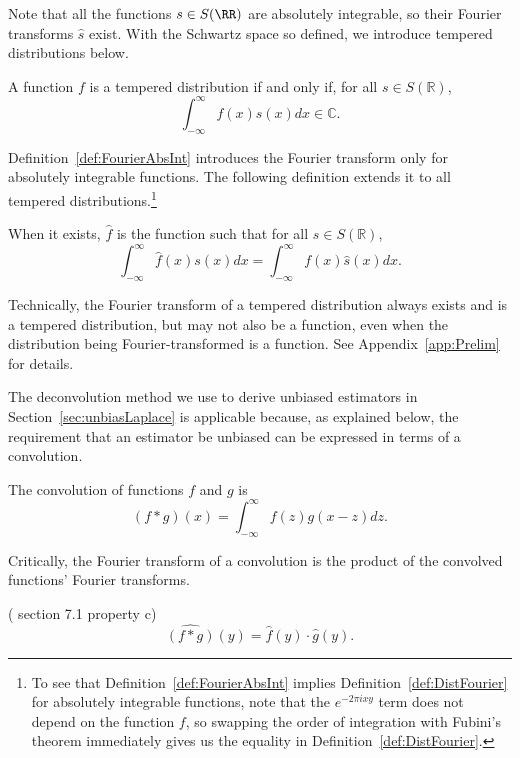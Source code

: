 \documentclass[11pt]{article}
\newcommand{\C}{\mathbb{C}}
\newcommand{\R}{\mathbb{R}}
\begin{document}
Note that all the functions $s \in S(\RR)$ are absolutely integrable, so their Fourier transforms $\hat s$ exist. With the Schwartz space so defined, we introduce tempered distributions below.

\begin{definition} \label{def:tmprDist}
    A function $f$ is a tempered distribution if and only if, for all $s \in S(\R)$,
    $$\int_{-\infty}^\infty f(x) s(x)dx \in \C.$$
\end{definition}

Definition~\ref{def:FourierAbsInt} introduces the Fourier transform only for absolutely integrable functions. The following definition extends it to all tempered distributions.\footnote{To see that Definition~\ref{def:FourierAbsInt} implies Definition~\ref{def:DistFourier} for absolutely integrable functions, note that the $e^{-2\pi ixy}$ term does not depend on the function $f$, so swapping the order of integration with Fubini's theorem immediately gives us the equality in Definition~\ref{def:DistFourier}.}

\begin{definition} \label{def:DistFourier}
    When it exists, $\hat{f}$ is the function such that for all $s \in S(\R)$,
    $$\int_{-\infty}^\infty \hat{f}(x) s(x)dx = \int_{-\infty}^\infty f(x) \hat{s}(x)dx.$$
\end{definition}

Technically, the Fourier transform of a tempered distribution always exists and is a tempered distribution, but may not also be a function, even when the distribution being Fourier-transformed is a function. See Appendix~\ref{app:Prelim} for details.

The deconvolution method we use to derive unbiased estimators in Section~\ref{sec:unbiasLaplace} is applicable because, as explained below, the requirement that an estimator be unbiased can be expressed in terms of a convolution.

\begin{definition}
    The convolution of functions $f$ and $g$ is
    $$(f*g)(x) = \int_{-\infty}^\infty f(z) g(x-z) dz.$$
\end{definition}

Critically, the Fourier transform of a convolution is the product of the convolved functions' Fourier transforms.

\begin{theorem}
\label{thm:convolution}
    (\cite{vanDijk+2013} section 7.1 property c)
    $$\widehat{(f*g)}(y) = \hat{f}(y) \cdot \hat{g}(y).$$
\end{theorem}
\end{document}
